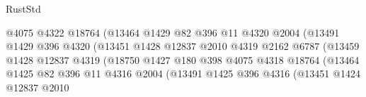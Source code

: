 \begin{lexlean}{RustStd}
\begin{coremodule}
{\begin{coremodule}
{{{{{{{{{{{{{{{{{{{{{{{{{{{{{{{                                          @4075
                                          @4322
                                          @18764
                                          (@13464
                                            @1429
                                            @82
                                            @396
                                            @11
                                            @4320
                                            @2004
                                            (@13491
                                              @1429
                                              @396
                                              @4320
                                              (@13451
                                                @1428
                                                @12837
                                                @2010
                                                @4319
                                                @2162
                                                @6787
                                                (@13459
                                                  @1428
                                                  @12837
                                                  @4319
                                                  (@18750
                                                    @1427
                                                    @180
                                                    @398
                                                    @4075
                                                    @4318
                                                    @18764
                                                    (@13464
                                                      @1425
                                                      @82
                                                      @396
                                                      @11
                                                      @4316
                                                      @2004
                                                      (@13491
                                                        @1425
                                                        @396
                                                        @4316
                                                        (@13451
                                                          @1424
                                                          @12837
                                                          @2010
}}}}}}}}}}}}}}}}}}}}}}}}}}}}}}}
\end{coremodule}}
\end{coremodule}
\end{lexlean}
